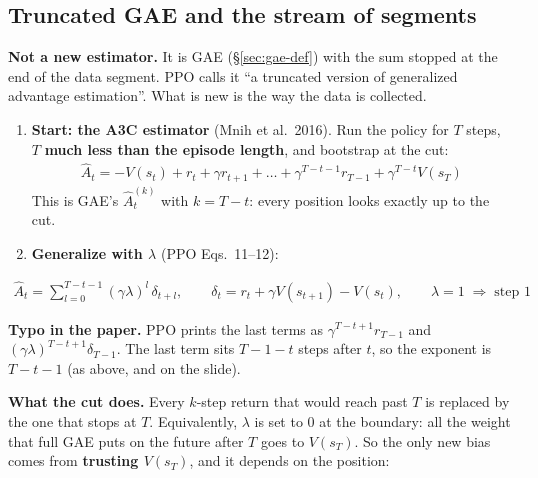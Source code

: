 \subsection{Truncated GAE and the stream of segments}
\label{sec:ppo-truncgae}

\textbf{Not a new estimator.} It is GAE (\S\ref{sec:gae-def}) with the sum stopped at the end of the data segment. PPO calls it ``a truncated version of generalized advantage estimation''. What is new is the way the data is collected.

\begin{enumerate}
  \item \textbf{Start: the A3C estimator} (Mnih et al.\ 2016). Run the policy for $T$ steps, $T$ \textbf{much less than the episode length}, and bootstrap at the cut:
  \begin{gather*}
    \hat A_t = -V(s_t) + r_t + \gamma r_{t+1} + \dots + \gamma^{T-t-1} r_{T-1} + \gamma^{T-t} V(s_T)
  \end{gather*}
  This is GAE's $\hat A_t^{(k)}$ with $k = T-t$: every position looks exactly up to the cut.
  \item \textbf{Generalize with $\lambda$} (PPO Eqs.~11--12):
\end{enumerate}

\begin{eqbox}
\begin{gather*}
  \hat A_t = \sum_{l=0}^{T-t-1}(\gamma\lambda)^l\,\delta_{t+l},
  \qquad \delta_t = r_t + \gamma V(s_{t+1}) - V(s_t),
  \qquad \lambda=1 \;\Rightarrow\; \text{step 1}
\end{gather*}
\end{eqbox}

\begin{notebox}
\textbf{Typo in the paper.} PPO prints the last terms as $\gamma^{T-t+1}r_{T-1}$ and $(\gamma\lambda)^{T-t+1}\delta_{T-1}$. The last term sits $T-1-t$ steps after $t$, so the exponent is $T-t-1$ (as above, and on the slide).
\end{notebox}

\textbf{What the cut does.} Every $k$-step return that would reach past $T$ is replaced by the one that stops at $T$. Equivalently, $\lambda$ is set to $0$ at the boundary: all the weight that full GAE puts on the future after $T$ goes to $V(s_T)$. So the only new bias comes from \textbf{trusting $V(s_T)$}, and it depends on the position:

